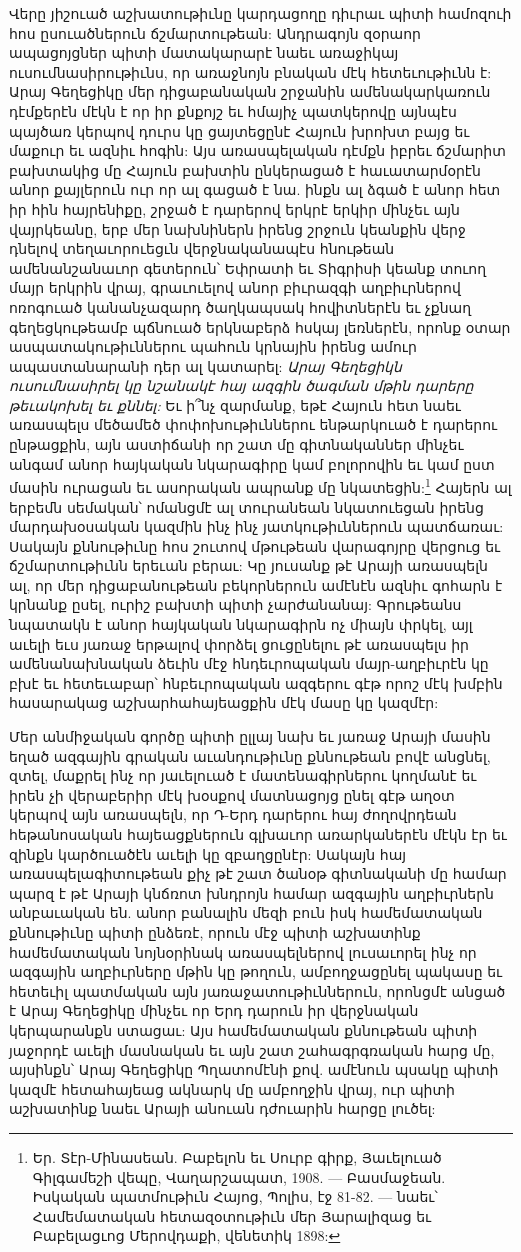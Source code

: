 \documentclass{article}
\begin{document}
{Վերը յիշուած աշխատութիւնը կարդացողը դիւրաւ պիտի համոզուի հոս ըսուածներուն ճշմարտութեան: Անդրագոյն զօրաոր ապացոյցներ պիտի մատակարարէ նաեւ առաջիկայ ուսումնասիրութիւնս, որ առաջնոյն բնական մէկ հետեւութիւնն է: Արայ Գեղեցիկը մեր դիցաբանական շրջանին ամենակարկառուն դէմքերէն մէկն է որ իր քնքոյշ եւ հմայիչ պատկերովը այնպէս պայծառ կերպով դուրս կը ցայտեցընէ Հայուն խրոխտ բայց եւ մաքուր եւ ազնիւ հոգին: Այս առասպելական դէմքն իբրեւ ճշմարիտ բախտակից մը Հայուն բախտին ընկերացած է հաւատարմօրէն անոր քայլերուն ուր որ ալ գացած է նա. ինքն ալ ձգած է անոր հետ իր հին հայրենիքը, շրջած է դարերով երկրէ երկիր մինչեւ այն վայրկեանը, երբ մեր նախնիներն իրենց շրջուն կեանքին վերջ դնելով տեղաւորուեցւն վերջնականապէս հնութեան ամենանշանաւոր գետերուն՝ Եփրատի եւ Տիգրիսի կեանք տուող մայր երկրին վրայ, գրաւուելով անոր բիւրազգի աղբիւրներով ոռոգուած կանանչազարդ ծաղկապսակ հովիտներէն եւ չքնաղ գեղեցկութեամբ պճնուած երկնաբերձ հսկայ լեռներէն, որոնք օտար ասպատակութիւններու պահուն կրնային իրենց ամուր ապաստանարանի դեր ալ կատարել: \emph{Արայ Գեղեցիկն ուսումնասիրել կը նշանակէ հայ ազգին ծագման մթին դարերը թեւակոխել եւ քննել:} Եւ ի՞նչ զարմանք, եթէ Հայուն հետ նաեւ առասպելս մեծամեծ փոփոխութիւններու ենթարկուած է դարերու ընթացքին, այն աստիճանի որ շատ մը գիտնականներ մինչեւ անգամ անոր հայկական նկարագիրը կամ բոլորովին եւ կամ ըստ մասին ուրացան եւ ասորական ապրանք մը նկատեցին:\footnote{Եր. Տէր-Մինասեան. Բաբելոն եւ Սուրբ գիրք, Յաւելուած Գիլգամեշի վեպը, Վաղարշապատ, 1908. — Բասմաջեան. Իսկական պատմութիւն Հայոց, Պոլիս, էջ 81-82. — նաեւ՝ Համեմատական հետազօտութիւն մեր Յարալիզաց եւ Բաբելացւոց Մերովդաքի, վենետիկ 1898:} Հայերն ալ երբեմն սեմական՝ ոմանցմէ ալ տուրանեան նկատուեցան իրենց մարդախօսական կազմին ինչ ինչ յատկութիւններուն պատճառաւ: Սակայն քննութիւնը հոս շուտով մթութեան վարագոյրը վերցուց եւ ճշմարտութիւնն երեւան բերաւ: Կը յուսանք թէ Արայի առասպելն ալ, որ մեր դիցաբանութեան բեկորներուն ամէնէն ազնիւ գոհարն է կրնանք ըսել, ուրիշ բախտի պիտի չարժանանայ: Գրութեանս նպատակն է անոր հայկական նկարագիրն ոչ միայն փրկել, այլ աւելի եւս յառաջ երթալով փորձել ցուցընելու թէ առասպելս իր ամենանախնական ձեւին մէջ հնդեւրոպական մայր-աղբիւրէն կը բխէ եւ հետեւաբար՝ հնբեւրոպական ազգերու գէթ որոշ մէկ խմբին հասարակաց աշխարհահայեացքին մէկ մասը կը կազմէր:

Մեր անմիջական գործը պիտի ըլլայ նախ եւ յառաջ Արայի մասին եղած ազգային գրական աւանդութիւնը քննութեան բովէ անցնել, զտել, մաքրել ինչ որ յաւելուած է մատենագիրներու կողմանէ եւ իրեն չի վերաբերիր մէկ խօսքով մատնացոյց ընել գէթ աղօտ կերպով այն առասպելն, որ Դ-Երդ դարերու հայ ժողովրդեան հեթանոսական հայեացքներուն գլխաւոր առարկաներէն մէկն էր եւ զինքն կարծուածէն աւելի կը զբաղցընէր: Սակայն հայ առասպելագիտութեան քիչ թէ շատ ծանօթ գիտնականի մը համար պարզ է թէ Արայի կնճռոտ խնդրոյն համար ազգային աղբիւրներն անբաւական են. անոր բանալին մեզի բուն իսկ համեմատական քննութիւնը պիտի ընձեռէ, որուն մէջ պիտի աշխատինք համեմատական նոյնօրինակ առասպելներով լուսաւորել ինչ որ ազգային աղբիւրները մթին կը թողուն, ամբողջացընել պակասը եւ հետեւիլ պատմական այն յառաջատութիւններուն, որոնցմէ անցած է Արայ Գեղեցիկը մինչեւ որ Երդ դարուն իր վերջնական կերպարանքն ստացաւ: Այս համեմատական քննութեան պիտի յաջորդէ աւելի մասնական եւ այն շատ շահագրգռական հարց մը, այսինքն՝ Արայ Գեղեցիկը Պղատոմէնի քով. ամէնուն պսակը պիտի կազմէ հետահայեաց ակնարկ մը ամբողջին վրայ, ուր պիտի աշխատինք նաեւ Արայի անուան դժուարին հարցը լուծել:}
\clearpage
\end{document}
